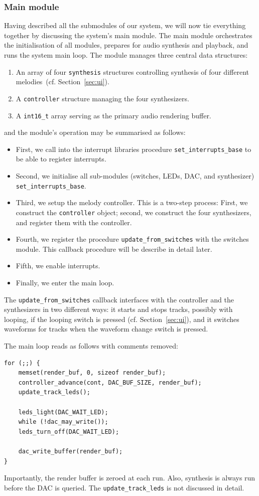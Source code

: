 \documentclass[a4paper,9pt]{article}
\newcommand{\isrc}[1]{\texttt{#1}}
\begin{document}
\subsubsection{Main module}
Having described all the submodules of our system, we will now tie everything
together by discussing the system's main module. The main module orchestrates
the initialisation of all modules, prepares for audio synthesis and
playback, and runs the system main loop.
The module manages three central data structures: 
\begin{enumerate}
    \item An array of four \isrc{synthesis} structures controlling synthesis
        of four different melodies~(cf. Section~\ref{sec:ui}).
    \item A \isrc{controller} structure managing the four synthesizers.
    \item A \isrc{int16\_t} array serving as the primary audio rendering
        buffer.
\end{enumerate}
and the module's operation may be summarised as follows:
\begin{itemize}
    \item First, we call into the interrupt libraries procedure
        \isrc{set\_interrupts\_base} to be able to register interrupts. 
    \item Second, we initialise all sub-modules (switches, LEDs, DAC, and
        synthesizer) \isrc{set\_interrupts\_base}.
    \item Third, we setup the melody controller. This is a two-step process:
        First, we construct the \isrc{controller} object; second, we construct
        the four synthesizers, and register them with the controller.
    \item Fourth, we register the procedure \isrc{update\_from\_switches} with
        the switches module. This callback procedure will be describe in
        detail later.
    \item Fifth, we enable interrupts.
    \item Finally, we enter the main loop.
\end{itemize}
The \isrc{update\_from\_switches} callback interfaces with the controller and
the synthesizers in two different ways: it starts and stops tracks, possibly
with looping, if the looping switch is pressed (cf.
Section~\ref{sec:ui}), and it switches waveforms for tracks when the
waveform change switch is pressed. 

The main loop reads as follows with comments removed:
\begin{lstlisting}
for (;;) {
    memset(render_buf, 0, sizeof render_buf);
    controller_advance(cont, DAC_BUF_SIZE, render_buf);
    update_track_leds();
    
    leds_light(DAC_WAIT_LED);
    while (!dac_may_write());
    leds_turn_off(DAC_WAIT_LED);

    dac_write_buffer(render_buf);
}
\end{lstlisting}
Importantly, the render buffer is zeroed at each run. Also, synthesis is
always run before the DAC is queried. The \isrc{update\_track\_leds}
is not discussed in detail. 
\end{document}
